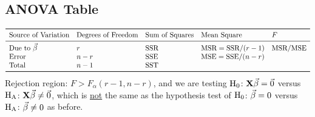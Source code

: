 \subsection*{ANOVA Table}
\[ \begin{array}{lllll}
        \toprule
        \text{Source of Variation}   & \text{Degrees of Freedom} & \text{Sum of Squares} & \text{Mean Square} & F         \\
        \midrule
        \text{Due to }\Vector{\beta} & r                         & \SSR                  & \MSR=\SSR/(r-1)    & \MSR/\MSE \\
        \text{Error}                 & n-r                       & \SSE                  & \MSE=\SSE/(n-r)                \\
        \text{Total}                 & n-1                       & \SST                                                   \\
        \bottomrule
    \end{array} \]
Rejection region: $ F>F_{\alpha}(r-1,n-r) $, and we are testing
$ \text{H}_0 $: $ \mathbf{X}\vec{\beta}=\vec{0} $ versus $ \text{H}_{\text{A}} $:  $ \mathbf{X}\vec{\beta}\ne\vec{0} $,
which is \underline{not} the same as the hypothesis test of $ \text{H}_0 $: $ \vec{\beta}=0 $ versus
$ \text{H}_{\text{A}} $: $ \vec{\beta}\ne 0 $ as before.
